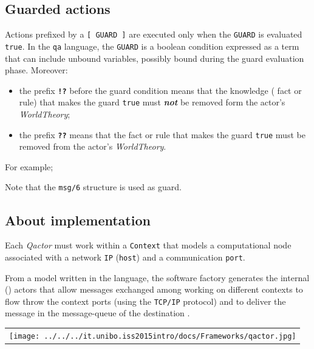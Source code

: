 \subsection{Guarded actions}

Actions prefixed by a \texttt{[ GUARD ]} are executed only when the \texttt{GUARD} is evaluated \texttt{true}. In the \texttt{qa} language, the \texttt{GUARD} is a boolean condition expressed as a \prolog{} term that can include unbound variables, possibly bound during the guard evaluation phase.
Moreover:

\begin{itemize}
\item  the prefix \texttt{\textbf{!?}} before the guard condition means that the knowledge (\prolog{} fact or rule) that makes the guard \texttt{true} must \textit{\textbf{not}} be removed form the actor's \textit{WorldTheory};
\item the prefix \texttt{\textbf{??}} means that the \prolog{} fact or rule that makes the guard \texttt{true} must be removed from  the actor's \textit{WorldTheory}.
\end{itemize}

For example;
  

Note that the \texttt{msg/6} structure is used as guard.

\subsection{About implementation}  
  

Each \textit{Qactor} must work within a  \texttt{Context} that models a computational node associated with a network \texttt{IP} (\texttt{host}) and a communication \texttt{port}. 

From a model written in the \qa{} language, the \qa{} software factory generates the internal (\akka) actors that allow 
messages exchanged among \qa{} working on different contexts to flow throw the context ports (using the \texttt{TCP/IP} protocol) and to deliver the message in the message-queue of the destination \qa{}.
 
\begin{center}
\begin{tabular}{ c }
     \texttt{[image: ../../../it.unibo.iss2015intro/docs/Frameworks/qactor.jpg]}\\
\end{tabular}{   }
\end{center}
